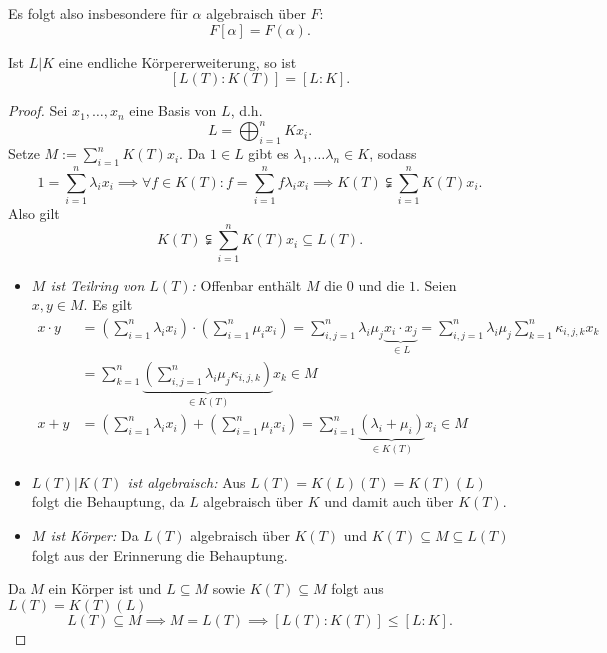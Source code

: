 \begin{bemerkung}
    Es folgt also insbesondere für $\alpha$ algebraisch über $F$:
    $$ F[\alpha] = F(\alpha). $$
\end{bemerkung}

\begin{lemma}\label{lemma:finiteExp}
    Ist $L|K$ eine endliche Körpererweiterung,
    so ist $$ [L(T):K(T)] = [L:K]. $$
\end{lemma}
\begin{proof}
    Sei $x_1, \ldots, x_n$ eine Basis von $L$, d.h. 
    $$ L = \bigoplus_{i=1}^n Kx_i. $$
    Setze $ M := \sum\limits_{i=1}^n K(T)x_i$. Da $1 \in L$ gibt es $\lambda_1, \ldots \lambda_n \in K$, sodass
    $$ 1 = \sum_{i=1}^n \lambda_i x_i 
        \implies \forall f \in K(T)\colon f=\sum_{i=1}^n f\lambda_ix_i 
        \implies K(T) \subsetneqq \sum_{i=1}^n K(T)x_i. $$
    Also gilt
    $$ K(T) \subsetneqq \sum_{i=1}^n K(T)x_i \subseteq L(T). $$
    \begin{itemize}
        \item \textit{$M$ ist Teilring von $L(T)$:}
        Offenbar enthält $M$ die $0$ und die $1$. Seien $x,y \in M$. Es gilt
        \begin{align*}
            x\cdot y &= \left(\sum_{i=1}^n \lambda_i x_i \right)\cdot\left(\sum_{i=1}^n \mu_i x_i\right) 
                = \sum_{i,j=1}^n \lambda_i \mu_j \underbrace{x_i \cdot x_j}_{\in L}
                =\sum_{i,j=1}^n \lambda_i \mu_j \sum_{k=1}^n \kappa_{i,j,k} x_k\\
                &= \sum_{k=1}^n \underbrace{\left(\sum_{i,j=1}^n \lambda_i \mu_j \kappa_{i,j,k}\right)}_{\in K(T)} x_k \in M\\
            x + y &= \left(\sum_{i=1}^n \lambda_i x_i \right)+\left(\sum_{i=1}^n \mu_i x_i\right)
                = \sum_{i=1}^n \underbrace{(\lambda_i + \mu_i)}_{\in K(T)}x_i \in M
        \end{align*}

        \item \textit{$L(T)|K(T)$ ist algebraisch:} Aus $L(T) = K(L)(T) = K(T)(L)$ folgt die Behauptung, 
        da $L$ algebraisch über $K$ und damit auch über $K(T)$.

        \item \textit{$M$ ist Körper:} Da $L(T)$ algebraisch über $K(T)$ und $K(T) \subseteq M \subseteq L(T)$ 
        folgt aus der Erinnerung die Behauptung.
    \end{itemize}

    Da $M$ ein Körper ist und $L \subseteq M$ sowie $K(T) \subseteq M$ folgt aus $L(T) = K(T)(L)$
    $$ L(T) \subseteq M \implies M = L(T) \implies [L(T):K(T)] \leq [L:K].$$


\end{proof}
